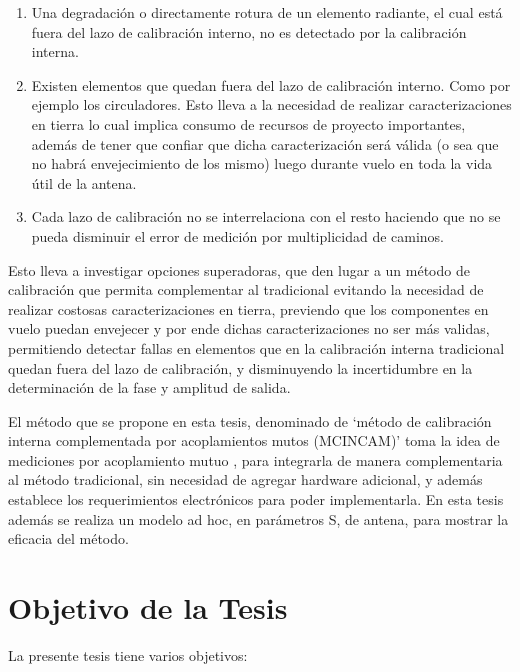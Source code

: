 \begin{enumerate}
    \item Una degradación o directamente rotura de un elemento radiante, el cual está fuera del lazo de calibración interno, no 
			es detectado por la calibración interna.
    \item Existen elementos que quedan fuera del lazo de calibración interno. Como por ejemplo los circuladores. Esto lleva a 
			la necesidad de realizar caracterizaciones en tierra lo cual implica consumo de recursos de proyecto importantes, 
			además de tener que confiar que dicha caracterización será válida (o sea que no habrá envejecimiento de los mismo) 
			luego durante vuelo en toda la vida útil de la antena.
    \item Cada lazo de calibración no se interrelaciona con el resto haciendo que no se pueda disminuir el error de medición por 
			multiplicidad de caminos.
\end{enumerate}

Esto lleva a investigar opciones superadoras, que den lugar a un método de calibración que permita complementar al tradicional 
evitando la necesidad de realizar costosas caracterizaciones en tierra, previendo que los componentes en vuelo puedan envejecer 
y por ende dichas caracterizaciones no ser más validas, permitiendo detectar fallas en elementos que en la calibración interna 
tradicional quedan fuera del lazo de calibración, y disminuyendo la incertidumbre en la determinación de la fase y amplitud de 
salida.

El método que se propone en esta tesis, denominado de \enquote*{método de calibración interna complementada por acoplamientos 
mutos (MCINCAM)} toma la idea de mediciones por acoplamiento mutuo \cite{Agrawal2003}\cite{Shipley2000} \cite{Aumann1989}
\cite{Chen2012}, para integrarla de manera complementaria al método tradicional, sin necesidad de agregar hardware 
adicional, y además establece los requerimientos electrónicos para poder implementarla. En esta tesis además se realiza un modelo 
ad hoc, en parámetros S, de antena, para mostrar la eficacia del método. 


\section{Objetivo de la Tesis}

La presente tesis tiene varios objetivos:

